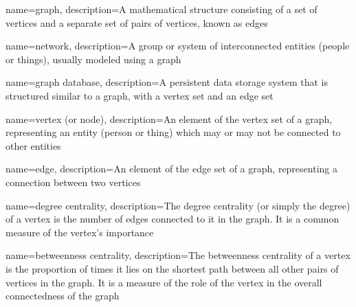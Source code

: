 \usepackage{booktabs}
\usepackage{longtable}
\usepackage{graphicx}
\usepackage[bf,singlelinecheck=off]{caption}
\usepackage[scale=.8]{sourcecodepro}


\usepackage{framed,color}

\renewcommand{\textfraction}{0.05}
\renewcommand{\topfraction}{0.8}
\renewcommand{\bottomfraction}{0.8}
\renewcommand{\floatpagefraction}{0.75}

\renewenvironment{quote}{\begin{VF}}{\end{VF}}
\let\oldhref\href
\renewcommand{\href}[2]{#2\footnote{\url{#1}}}

\makeatletter


\usepackage{makeidx}
\makeindex


\usepackage{amsthm}
\makeatletter
\def\thm@space@setup{%
  \thm@preskip=8pt plus 2pt minus 4pt
  \thm@postskip=\thm@preskip
}
\makeatother

\usepackage[nonumberlist]{glossaries}
\makenoidxglossaries

{
    name={graph},
    description={A mathematical structure consisting of a set of vertices and a separate set of pairs of vertices, known as edges}
}

{
    name={network},
    description={A group or system of interconnected entities (people or things), usually modeled using a graph}
}

{
    name={graph database},
    description={A persistent data storage system that is structured similar to a graph, with a vertex set and an edge set}
}

{
    name={vertex (or node)},
    description={An element of the vertex set of a graph, representing an entity (person or thing) which may or may not be connected to other entities}
}

{
    name={edge},
    description={An element of the edge set of a graph, representing a connection between two vertices}
}

{
    name={degree centrality},
    description={The degree centrality (or simply the degree) of a vertex is the number of edges connected to it in the graph. It is a common measure of the vertex's importance}
}

{
    name={betweenness centrality},
    description={The betweenness centrality of a vertex is the proportion of times it lies on the shortest path between all other pairs of vertices in the graph. It is a measure of the role of the vertex in the overall connectedness of the graph}
}

